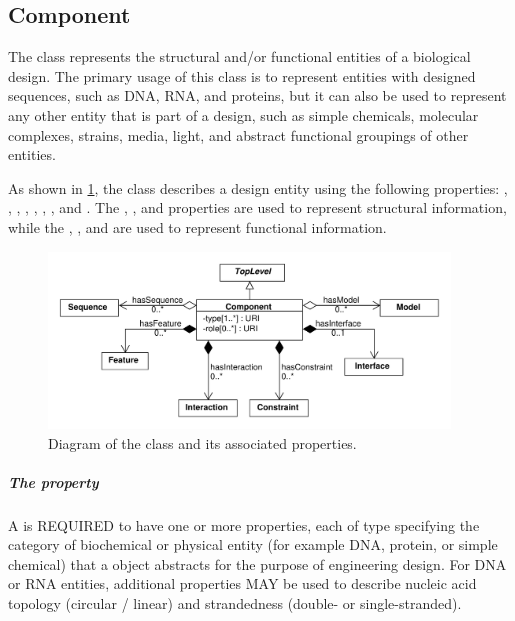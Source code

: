 \subsection{Component}
\label{sec:Component}

The  class represents the structural and/or functional entities of a biological design. The primary usage of this class is to represent entities with designed sequences, such as DNA, RNA, and proteins, but it can also be used to represent any other entity that is part of a design, such as simple chemicals, molecular complexes, strains, media, light, and abstract functional groupings of other entities.

As shown in \ref{uml:component}, the  class describes a design entity using the following properties: , , , , , , , and .  
The , , and  properties are used to represent structural information, while the , , and  are used to represent functional information.

\begin{figure}[ht]
\begin{center}
\includegraphics[width=0.95\textwidth]{uml/component}
\caption[]{Diagram of the  class and its associated properties.}
\label{uml:component}
\end{center}
\end{figure} 

\subparagraph{The  property}
\label{sec:type:C}

A  is REQUIRED to have one or more  properties, each of type  specifying the category of biochemical or physical entity (for example DNA, protein, or simple chemical) that a  object abstracts
for the purpose of engineering design. For DNA or RNA entities, additional  properties MAY be used to describe nucleic acid topology (circular / linear) and strandedness (double- or single-stranded).


